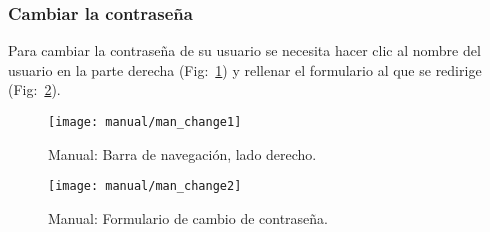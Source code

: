 \subsubsection{Cambiar la contraseña}
Para cambiar la contraseña de su usuario se necesita hacer clic al nombre del usuario en la parte derecha (Fig:~\ref{fig:man_username}) y rellenar el formulario al que se  redirige (Fig:~\ref{fig:man_changepass}).

\begin{figure}
	\centering
	\texttt{[image: manual/man\_change1]}
	\caption{Manual: Barra de navegación, lado derecho.}
	\label{fig:man_username}
\end{figure}

\begin{figure}
	\centering
	\texttt{[image: manual/man\_change2]}
	\caption{Manual: Formulario de cambio de contraseña.}
	\label{fig:man_changepass}
\end{figure}

